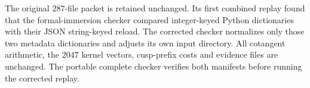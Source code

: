 The original $287$-file packet is retained unchanged. Its first combined replay found that the formal-immersion checker compared integer-keyed Python dictionaries with their JSON string-keyed reload. The corrected checker normalizes only those two metadata dictionaries and adjusts its own input directory. All cotangent arithmetic, the $2047$ kernel vectors, cusp-prefix costs and evidence files are unchanged. The portable complete checker verifies both manifests before running the corrected replay.
